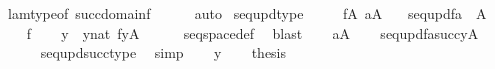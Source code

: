 \begin{isabellebody}
\ lam{\isacharunderscore}{\kern0pt}type{\isacharbrackleft}{\kern0pt}of\ {\isachardoublequoteopen}succ{\isacharparenleft}{\kern0pt}domain{\isacharparenleft}{\kern0pt}f{\isacharparenright}{\kern0pt}{\isacharparenright}{\kern0pt}{\isachardoublequoteclose}{\isacharbrackright}{\kern0pt}\isanewline
\ \ \ \ \isamarkupfalse%
\ auto\isanewline
{}\isamarkupfalse%
%
\endisatagproof
{\isafoldproof}%
%
\isadelimproof
\isanewline
%
\endisadelimproof
\isanewline
{}\isamarkupfalse%
\ seq{\isacharunderscore}{\kern0pt}upd{\isacharunderscore}{\kern0pt}type\ {\isacharcolon}{\kern0pt}\ \isanewline
\ \ \ {\isachardoublequoteopen}f{\isasymin}A{\isacharcircum}{\kern0pt}{\isacharless}{\kern0pt}{\isasymomega}{\isachardoublequoteclose}\ {\isachardoublequoteopen}a{\isasymin}A{\isachardoublequoteclose}\isanewline
\ \ \ {\isachardoublequoteopen}seq{\isacharunderscore}{\kern0pt}upd{\isacharparenleft}{\kern0pt}f{\isacharcomma}{\kern0pt}a{\isacharparenright}{\kern0pt}\ {\isasymin}\ A{\isacharcircum}{\kern0pt}{\isacharless}{\kern0pt}{\isasymomega}{\isachardoublequoteclose}\isanewline
%
\isadelimproof
%
\endisadelimproof
%
\isatagproof
{}\isamarkupfalse%
\ {\isacharminus}{\kern0pt}\isanewline
\ \ \isamarkupfalse%
\ {\isacartoucheopen}f{\isasymin}{\isacharunderscore}{\kern0pt}{\isacartoucheclose}\isanewline
\ \ \isamarkupfalse%
\ y\ \ {\isachardoublequoteopen}y{\isasymin}nat{\isachardoublequoteclose}\ {\isachardoublequoteopen}f{\isasymin}y{\isasymrightarrow}A{\isachardoublequoteclose}\isanewline
\ \ \ \ \isamarkupfalse%
\ seqspace{\isacharunderscore}{\kern0pt}def\ \isamarkupfalse%
\ blast\isanewline
\ \ \isamarkupfalse%
\ {\isacartoucheopen}a{\isasymin}A{\isacartoucheclose}\isanewline
\ \ \isamarkupfalse%
\ {\isachardoublequoteopen}seq{\isacharunderscore}{\kern0pt}upd{\isacharparenleft}{\kern0pt}f{\isacharcomma}{\kern0pt}a{\isacharparenright}{\kern0pt}{\isasymin}succ{\isacharparenleft}{\kern0pt}y{\isacharparenright}{\kern0pt}{\isasymrightarrow}A{\isachardoublequoteclose}\ \isanewline
\ \ \ \ \isamarkupfalse%
\ seq{\isacharunderscore}{\kern0pt}upd{\isacharunderscore}{\kern0pt}succ{\isacharunderscore}{\kern0pt}type\ \isamarkupfalse%
\ simp\isanewline
\ \ \isamarkupfalse%
\ {\isacartoucheopen}y{\isasymin}{\isacharunderscore}{\kern0pt}{\isacartoucheclose}\isanewline
\ \ \isamarkupfalse%
\ {\isacharquery}{\kern0pt}thesis\isanewline

\end{isabellebody}
